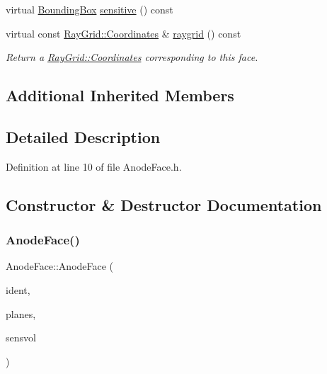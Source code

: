 \begin{DoxyCompactItemize}
virtual \hyperlink{class_wire_cell_1_1_bounding_box}{Bounding\+Box} \hyperlink{class_wire_cell_1_1_gen_1_1_anode_face_a8e9613ee708a9b68c939d135e425e488}{sensitive} () const
\item 
virtual const \hyperlink{class_wire_cell_1_1_ray_grid_1_1_coordinates}{Ray\+Grid\+::\+Coordinates} \& \hyperlink{class_wire_cell_1_1_gen_1_1_anode_face_a1ee64f5c3c63f9d44907fd06d6bb6abe}{raygrid} () const
\begin{DoxyCompactList}\small\item\em Return a \hyperlink{class_wire_cell_1_1_ray_grid_1_1_coordinates}{Ray\+Grid\+::\+Coordinates} corresponding to this face. \end{DoxyCompactList}\end{DoxyCompactItemize}
\subsection*{Additional Inherited Members}


\subsection{Detailed Description}


Definition at line 10 of file Anode\+Face.\+h.



\subsection{Constructor \& Destructor Documentation}
\mbox{\label{class_wire_cell_1_1_gen_1_1_anode_face_aa01e7fc2f74294dac3babc087c9e790f}} 
\subsubsection{\texorpdfstring{Anode\+Face()}{AnodeFace()}}
{\footnotesize\ttfamily Anode\+Face\+::\+Anode\+Face (\begin{DoxyParamCaption}\item[{int}]{ident,  }\item[{\hyperlink{class_wire_cell_1_1_i_component_a18978d88ce697af5941655a89660fd4e}{I\+Wire\+Plane\+::vector}}]{planes,  }\item[{const \hyperlink{class_wire_cell_1_1_bounding_box}{Bounding\+Box} \&}]{sensvol }\end{DoxyParamCaption})}



